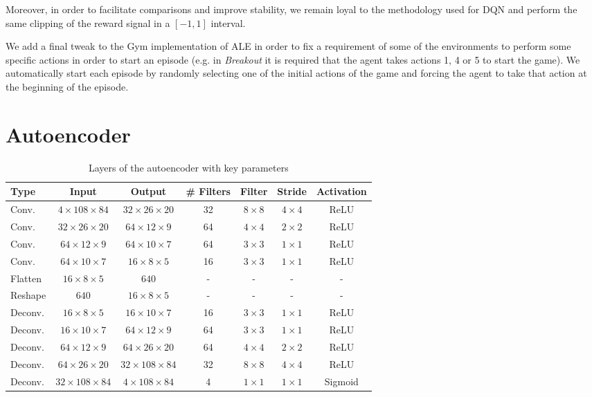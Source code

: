 Moreover, in order to facilitate comparisons and improve stability, we remain 
loyal to the methodology used for DQN and perform the same clipping of the 
reward signal in a $[-1, 1]$ interval. 

We add a final tweak to the Gym implementation of ALE in order to fix a 
requirement of some of the environments to perform some specific actions in 
order to start an episode (e.g. in \textit{Breakout} it is required that the 
agent takes actions 1, 4 or 5 to start the game). We automatically start each 
episode by randomly selecting one of the initial actions of the game and forcing
the agent to take that action at the beginning of the episode. 

\section{Autoencoder}
%
\begin{table}[h]
    \centering
    \begin{tabular}{l c c c c c c} 
	\hline
	Type & Input & Output & \# Filters & Filter & Stride & Activation \\ 
	\hline 
	Conv. & $4 \times 108 \times 84$ & $32 \times 26 \times 20$ & 32 & $8 \times 8$ & $4 \times 4$ & ReLU \\ 
	Conv. & $32 \times 26 \times 20$ & $64 \times 12 \times 9$ & 64 & $4 \times 4$ & $2 \times 2$ & ReLU \\ 
	Conv. & $64 \times 12 \times 9$ & $64 \times 10 \times 7$ & 64 & $3 \times 3$ & $1 \times 1$ & ReLU \\ 
	Conv. & $64 \times 10 \times 7$ & $16 \times 8 \times 5$ & 16 & $3 \times 3$ & $1 \times 1$ & ReLU \\ 
	Flatten	& $16 \times 8 \times 5$ & $640$ & - & - & - & - \\ 
	\hline
	Reshape & $640$ & $16 \times 8 \times 5$ & - & - & - & - \\
	Deconv. & $16 \times 8 \times 5$ & $16 \times 10 \times 7$ & 16 & $3 \times 3$ & $1 \times 1$ & ReLU \\ 
	Deconv. & $16 \times 10 \times 7$ & $64 \times 12 \times 9$ & 64 & $3 \times 3$ & $1 \times 1$ & ReLU \\
	Deconv. & $64 \times 12 \times 9$ & $64 \times 26 \times 20$ & 64 & $4 \times 4$ & $2 \times 2$ & ReLU \\
	Deconv. & $64 \times 26 \times 20$ & $32 \times 108 \times 84$ & 32 & $8 \times 8$ & $4 \times 4$ & ReLU \\
	Deconv. & $32 \times 108 \times 84$ & $4 \times 108 \times 84$ & 4 & $1 \times 1$ & $1 \times 1$ & Sigmoid \\
	\hline
    \end{tabular}
    \caption{Layers of the autoencoder with key parameters}
    \label{t:AE_structure}
\end{table}
